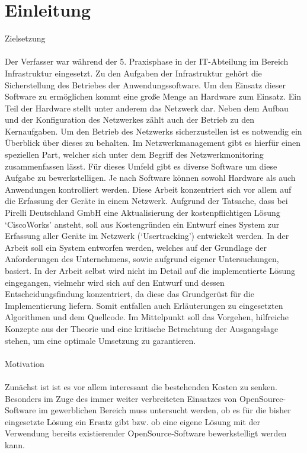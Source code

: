 \chapter{Einleitung}
\label{cha:Einleitung}

Zielsetzung\\
\\
Der Verfasser war während der 5. Praxisphase in der IT-Abteilung im Bereich Infrastruktur eingesetzt.
Zu den Aufgaben der Infrastruktur gehört die Sicherstellung des Betriebes der Anwendungssoftware. Um den Einsatz dieser Software zu ermöglichen kommt eine große Menge an Hardware zum Einsatz. Ein Teil der Hardware stellt unter anderem das Netzwerk dar. Neben dem Aufbau und der Konfiguration des Netzwerkes zählt auch der Betrieb zu den Kernaufgaben. Um den Betrieb des Netzwerks sicherzustellen ist es notwendig ein Überblick über dieses zu behalten.
Im Netzwerkmanagement gibt es hierfür einen speziellen Part, welcher sich unter dem Begriff des Netzwerkmonitoring zusammenfassen lässt. Für dieses Umfeld gibt es diverse Software um diese Aufgabe zu bewerkstelligen. Je nach Software können sowohl Hardware als auch Anwendungen kontrolliert werden. Diese Arbeit konzentriert sich vor allem auf die Erfassung der Geräte in einem Netzwerk. Aufgrund der Tatsache, dass bei Pirelli Deutschland GmbH eine Aktualisierung der kostenpflichtigen Lösung ‘CiscoWorks’ ansteht, soll aus Kostengründen ein Entwurf eines System zur Erfassung aller Geräte im Netzwerk (‘Usertracking’) entwickelt werden.
In der Arbeit soll ein System entworfen werden, welches auf der Grundlage der Anforderungen des Unternehmens, sowie aufgrund eigener Untersuchungen, basiert. In der Arbeit selbst wird nicht im Detail auf die implementierte Lösung eingegangen, vielmehr wird sich auf den Entwurf und dessen Entscheidungsfindung konzentriert, da diese das Grundgerüst für die Implementierung liefern. Somit entfallen auch Erläuterungen zu eingesetzten Algorithmen und dem Quellcode.
Im Mittelpunkt soll das Vorgehen, hilfreiche Konzepte aus der Theorie und eine kritische Betrachtung der Ausgangslage stehen, um eine optimale Umsetzung zu garantieren.\\
\\
Motivation\\
\\
Zunächst ist ist es vor allem interessant die bestehenden Kosten zu senken. Besonders im Zuge des immer weiter verbreiteten Einsatzes von OpenSource-Software im gewerblichen Bereich muss untersucht werden, ob es für die bisher eingesetzte Lösung ein Ersatz gibt bzw. ob eine eigene Lösung mit der Verwendung bereits existierender OpenSource-Software bewerkstelligt werden kann.
